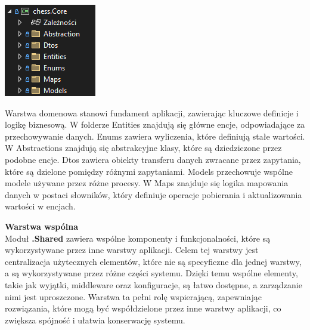 \documentclass[12pt,a4paper]{article}
\begin{document}
\vspace{0.5cm}
\begin{minipage}[t]{0.45\textwidth}
    \vspace{0pt}
    \centering
    \includegraphics[width=\linewidth]{images/struktura_back_core.png} 
\end{minipage}
\hfill
\begin{minipage}[t]{0.45\textwidth}
    \vspace{0pt}
    \raggedright
    Warstwa domenowa stanowi fundament aplikacji, zawierając kluczowe definicje i logikę biznesową. W folderze Entities znajdują się główne encje, odpowiadające za przechowywanie danych. Enums zawiera wyliczenia, które definiują stałe wartości. W Abstractions znajdują się abstrakcyjne klasy, które są dziedziczone przez podobne encje. Dtos zawiera obiekty transferu danych zwracane przez zapytania, które są dzielone pomiędzy różnymi zapytaniami. Models przechowuje wspólne modele używane przez różne procesy. W Maps znajduje się logika mapowania danych w postaci słowników, który definiuje operacje pobierania i aktualizowania wartości w encjach.
\end{minipage}

\newpage

\noindent \textbf{Warstwa wspólna}\\
Moduł \textbf{.Shared} zawiera wspólne komponenty i funkcjonalności, które są wykorzystywane przez inne warstwy aplikacji. Celem tej warstwy jest centralizacja użytecznych elementów, które nie są specyficzne dla jednej warstwy, a są wykorzystywane przez różne części systemu. Dzięki temu wspólne elementy, takie jak wyjątki, middleware oraz konfiguracje, są łatwo dostępne, a zarządzanie nimi jest uproszczone. Warstwa ta pełni rolę wspierającą, zapewniając rozwiązania, które mogą być współdzielone przez inne warstwy aplikacji, co zwiększa spójność i ułatwia konserwację systemu.
\end{document}
